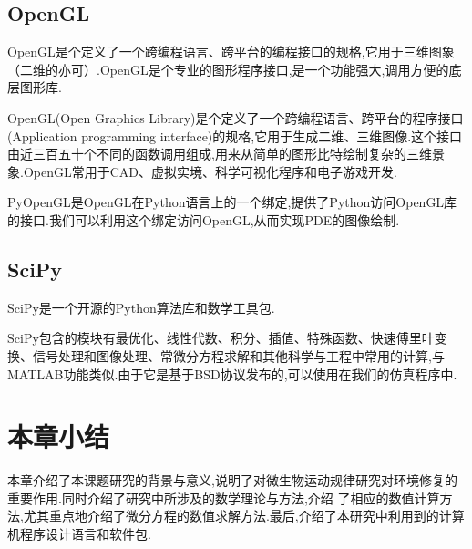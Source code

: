 \subsection{OpenGL}
OpenGL是个定义了一个跨编程语言、跨平台的编程接口的规格,它用于三维图象（二维的亦可）.OpenGL是个专业的图形程序接口,是一个功能强大,调用方便的底层图形库.\par
OpenGL(Open Graphics Library)是个定义了一个跨编程语言、跨平台的程序接口(Application programming interface)的规格,它用于生成二维、三维图像.这个接口由近三百五十个不同的函数调用组成,用来从简单的图形比特绘制复杂的三维景象.OpenGL常用于CAD、虚拟实境、科学可视化程序和电子游戏开发.\par
PyOpenGL是OpenGL在Python语言上的一个绑定,提供了Python访问OpenGL库的接口.我们可以利用这个绑定访问OpenGL,从而实现PDE的图像绘制.
\subsection{SciPy}
SciPy是一个开源的Python算法库和数学工具包.\par
SciPy包含的模块有最优化、线性代数、积分、插值、特殊函数、快速傅里叶变换、信号处理和图像处理、常微分方程求解和其他科学与工程中常用的计算,与MATLAB功能类似.由于它是基于BSD协议发布的,可以使用在我们的仿真程序中.
\section{本章小结}
本章介绍了本课题研究的背景与意义,说明了对微生物运动规律研究对环境修复的重要作用.同时介绍了研究中所涉及的数学理论与方法,介绍
了相应的数值计算方法,尤其重点地介绍了微分方程的数值求解方法.最后,介绍了本研究中利用到的计算机程序设计语言和软件包.